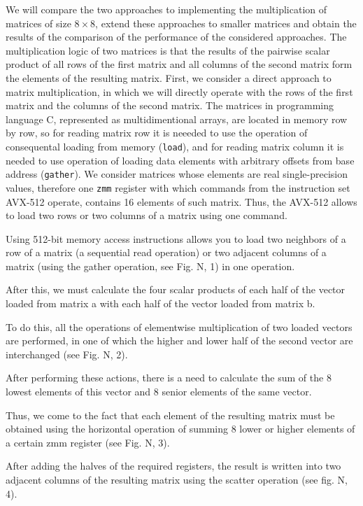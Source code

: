 \documentclass[
11pt,%
tightenlines,%
twoside,%
onecolumn,%
nofloats,%
nobibnotes,%
nofootinbib,%
superscriptaddress,%
noshowpacs,%
centertags]%
{revtex4}
\begin{document}
We will compare the two approaches to implementing the multiplication of matrices of size $8 \times 8$, extend these approaches to smaller matrices and obtain the results of the comparison of the performance of the considered approaches.
The multiplication logic of two matrices is that the results of the pairwise scalar product of all rows of the first matrix and all columns of the second matrix form the elements of the resulting matrix.
First, we consider a direct approach to matrix multiplication, in which we will directly operate with the rows of the first matrix and the columns of the second matrix.
The matrices in programming language C, represented as multidimentional arrays, are located in memory row by row, so for reading matrix row it is neeeded to use the operation of consequental loading from memory (\texttt{load}), and for reading matrix column it is needed to use operation of loading data elements with arbitrary offsets from base address (\texttt{gather}).
We consider matrices whose elements are real single-precision values, therefore one \texttt{zmm} register with which commands from the instruction set AVX-512 operate, contains 16 elements of such matrix.
Thus, the AVX-512 allows to load two rows or two columns of a matrix using one command.


Using 512-bit memory access instructions allows you to load two neighbors of a row of a matrix (a sequential read operation) or two adjacent columns of a matrix (using the gather operation, see Fig. N, 1) in one operation.

After this, we must calculate the four scalar products of each half of the vector loaded from matrix a with each half of the vector loaded from matrix b.

To do this, all the operations of elementwise multiplication of two loaded vectors are performed, in one of which the higher and lower half of the second vector are interchanged (see Fig. N, 2).

After performing these actions, there is a need to calculate the sum of the 8 lowest elements of this vector and 8 senior elements of the same vector.

Thus, we come to the fact that each element of the resulting matrix must be obtained using the horizontal operation of summing 8 lower or higher elements of a certain zmm register (see Fig. N, 3).

After adding the halves of the required registers, the result is written into two adjacent columns of the resulting matrix using the scatter operation (see fig. N, 4).
\end{document}

